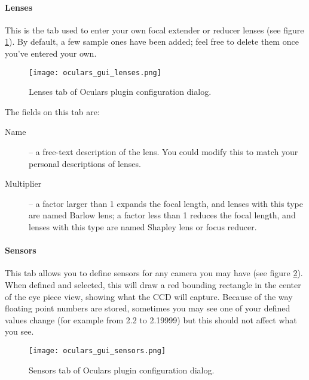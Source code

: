 \paragraph{Lenses}

This is the tab used to enter your own focal extender or reducer lenses (see figure \ref{fig:plugins:Oculars:Gui:Lenses}). 
By default, a few sample ones have been added; feel free to delete them once you've entered your own.

\begin{figure}[ht]\centering
\texttt{[image: oculars\_gui\_lenses.png]}
\caption{Lenses tab of Oculars plugin configuration dialog.}
\label{fig:plugins:Oculars:Gui:Lenses}
\end{figure}

The fields on this tab are:
\begin{description}
\item[Name] -- a free-text description of the lens. You could modify this to match your personal descriptions of lenses.
\item[Multiplier] -- a factor larger than 1 expands the focal length, and lenses with this type are named Barlow lens; 
                     a factor less   than 1 reduces the focal length, and lenses with this type are named Shapley lens or focus reducer.
\end{description}

\paragraph{Sensors}

This tab allows you to define sensors for any camera you may have (see figure \ref{fig:plugins:Oculars:Gui:Sensors}). 
When defined and selected, this will draw a red bounding rectangle in the center of the eye piece view, showing what the CCD will capture. 
Because of the way floating point numbers are stored, sometimes you may see one of your defined values change (for example from 2.2 to 2.19999) but this should not affect what you see.

\begin{figure}[ht]\centering
\texttt{[image: oculars\_gui\_sensors.png]}
\caption{Sensors tab of Oculars plugin configuration dialog.}
\label{fig:plugins:Oculars:Gui:Sensors}
\end{figure}

